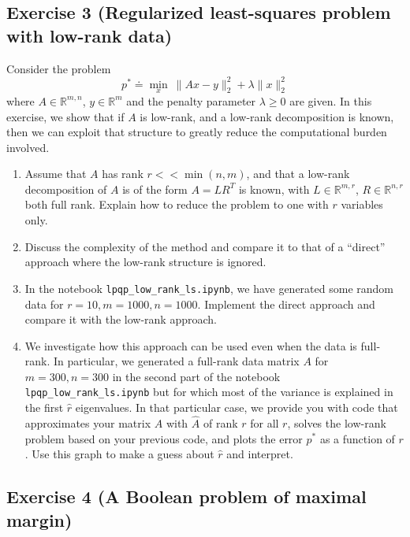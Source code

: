 \documentclass[11pt]{article}
\begin{document}
\newpage
\subsection*{Exercise 3 (Regularized least-squares problem with low-rank data)}

Consider the problem
\[
p^* \doteq \min_{x} \: \|Ax - y\|_2^2+ \lambda \|x\|_2^2
\]
where $A \in \mathbb{R}^{m,n}$, $y \in \mathbb{R}^{m}$ and the penalty parameter $\lambda \ge 0$ are given. In this exercise, we show that if $A$ is low-rank, and a low-rank decomposition is known, then we can exploit that structure to greatly reduce the computational burden involved.

\begin{enumerate}
    \item Assume that $A$ has rank $r << \min(n,m)$, and that a low-rank decomposition of $A$ is of the form $A = LR^T$ is known, with $L \in \mathbb{R}^{m,r}$, $R \in \mathbb{R}^{n,r}$ both full rank. Explain how to reduce the problem to one with $r$ variables only.

    \item Discuss the complexity of the method and compare it to that of a ``direct'' approach where the low-rank structure is ignored.

    \item In the notebook \verb+lpqp_low_rank_ls.ipynb+, we have generated some random data for $r=10, m=1000, n=1000$. Implement the direct approach and compare it with the low-rank approach.

    \item We investigate how this approach can be used even when the data is full-rank. In particular, we generated a full-rank data matrix $A$ for $m=300, n=300$ in the second part of the notebook \verb+lpqp_low_rank_ls.ipynb+ but for which most of the variance is explained in the first $\hat{r}$ eigenvalues. In that particular case, we provide you with code that approximates your matrix $A$ with $\hat{A}$ of rank $r$ for all $r$, solves the low-rank problem based on your previous code, and plots the error $p^*$ as a function of $r$. Use this graph to make a guess about $\hat{r}$ and interpret.
\end{enumerate}

\begin{solution}
\end{solution}

\newpage
\subsection*{Exercise 4 (A Boolean problem of maximal margin)}
\end{document}
